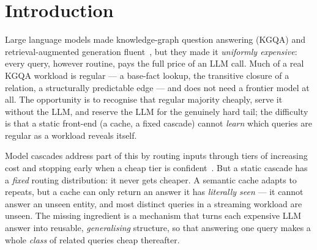 \documentclass[11pt]{article}
\theoremstyle{plain}
\begin{document}
\begin{abstract}
Tier-1 answers carry replayable Datalog proof trees,
and we prove an ontology-preservation guarantee
(Theorem~\ref{thm:soundness}) for the synthesised rules. The
distillation-over-caching effect that is neutral under the noisy KGQA
teacher turns \emph{positive} on a second domain: streaming GDPR
compliance cases from PrivaCI-Bench~\citep{privacibench2025} past three real
frontier teachers (gemini-3.5-flash, claude-sonnet-4.6, grok-4.3) over $3$
seeds at matched verdict accuracy, online rule distillation amortises measured
teacher cost by $1.5$--$2.1\times$ versus an LLM-only system --- against
${\sim}1.1\times$ for an exact-match cache and ${<}1\times$ for a faithful
in-context-strategy baseline --- with only a ${\sim}10\%$ repeat ceiling, so the
saving is rule \emph{generalisation}, not memoisation. We release the
implementation, the benchmark generator, and the full experiment grid.
\end{abstract}

\section{Introduction}

Large language models made knowledge-graph question answering (KGQA) and
retrieval-augmented generation fluent~\citep{lewis2020rag, edge2024graphrag},
but they made it \emph{uniformly expensive}: every query, however routine,
pays the full price of an LLM call. Much of a real KGQA workload is regular
--- a base-fact lookup, the transitive closure of a relation, a structurally
predictable edge --- and does not need a frontier model at all. The
opportunity is to recognise that regular majority cheaply, serve it without
the LLM, and reserve the LLM for the genuinely hard tail; the difficulty is
that a static front-end (a cache, a fixed cascade) cannot \emph{learn} which
queries are regular as a workload reveals itself.

Model cascades address part of this by routing inputs through tiers of
increasing cost and stopping early when a cheap tier is
confident~\citep{viswanathan2019cascade, chen2023frugalgpt}. But a static
cascade has a \emph{fixed} routing distribution: it never gets cheaper. A
semantic cache adapts to repeats, but a cache can only return an answer it
has \emph{literally seen} --- it cannot answer an unseen entity, and most
distinct queries in a streaming workload are unseen. The missing ingredient
is a mechanism that turns each expensive LLM answer into reusable,
\emph{generalising} structure, so that answering one query makes a whole
\emph{class} of related queries cheap thereafter.
\end{document}
